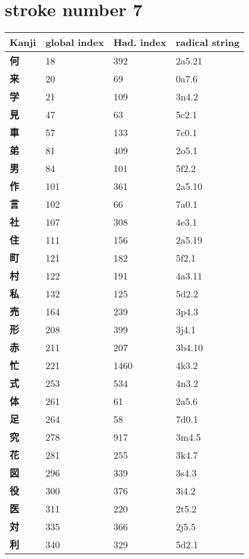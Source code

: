 \section{stroke number 7}
  \begin{longtable}[c]{llll}
    \bfseries Kanji & \bfseries global index & \bfseries Had. index & \bfseries radical string\\\hline\endhead
    \bfseries 何 & 18 & 392 & 2a5.21\\
    \bfseries 来 & 20 & 69 & 0a7.6\\
    \bfseries 学 & 21 & 109 & 3n4.2\\
    \bfseries 見 & 47 & 63 & 5c2.1\\
    \bfseries 車 & 57 & 133 & 7c0.1\\
    \bfseries 弟 & 81 & 409 & 2o5.1\\
    \bfseries 男 & 84 & 101 & 5f2.2\\
    \bfseries 作 & 101 & 361 & 2a5.10\\
    \bfseries 言 & 102 & 66 & 7a0.1\\
    \bfseries 社 & 107 & 308 & 4e3.1\\
    \bfseries 住 & 111 & 156 & 2a5.19\\
    \bfseries 町 & 121 & 182 & 5f2.1\\
    \bfseries 村 & 122 & 191 & 4a3.11\\
    \bfseries 私 & 132 & 125 & 5d2.2\\
    \bfseries 売 & 164 & 239 & 3p4.3\\
    \bfseries 形 & 208 & 399 & 3j4.1\\
    \bfseries 赤 & 211 & 207 & 3b4.10\\
    \bfseries 忙 & 221 & 1460 & 4k3.2\\
    \bfseries 式 & 253 & 534 & 4n3.2\\
    \bfseries 体 & 261 & 61 & 2a5.6\\
    \bfseries 足 & 264 & 58 & 7d0.1\\
    \bfseries 究 & 278 & 917 & 3m4.5\\
    \bfseries 花 & 281 & 255 & 3k4.7\\
    \bfseries 図 & 296 & 339 & 3s4.3\\
    \bfseries 役 & 300 & 376 & 3i4.2\\
    \bfseries 医 & 311 & 220 & 2t5.2\\
    \bfseries 対 & 335 & 366 & 2j5.5\\
    \bfseries 利 & 340 & 329 & 5d2.1\\

\end{longtable}
